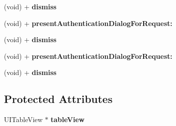 \begin{DoxyCompactItemize}
\item 
\hypertarget{interface_a_s_i_authentication_dialog_a56735bd2a28feda5aa645dbd7bf7b180}{
(void) + {\bfseries dismiss}}
\label{interface_a_s_i_authentication_dialog_a56735bd2a28feda5aa645dbd7bf7b180}

\item 
\hypertarget{interface_a_s_i_authentication_dialog_a07eb1b70ffa5f5279a32a23f3e1de378}{
(void) + {\bfseries present\-Authentication\-Dialog\-For\-Request\-:}}
\label{interface_a_s_i_authentication_dialog_a07eb1b70ffa5f5279a32a23f3e1de378}

\item 
\hypertarget{interface_a_s_i_authentication_dialog_a56735bd2a28feda5aa645dbd7bf7b180}{
(void) + {\bfseries dismiss}}
\label{interface_a_s_i_authentication_dialog_a56735bd2a28feda5aa645dbd7bf7b180}

\item 
\hypertarget{interface_a_s_i_authentication_dialog_a07eb1b70ffa5f5279a32a23f3e1de378}{
(void) + {\bfseries present\-Authentication\-Dialog\-For\-Request\-:}}
\label{interface_a_s_i_authentication_dialog_a07eb1b70ffa5f5279a32a23f3e1de378}

\item 
\hypertarget{interface_a_s_i_authentication_dialog_a56735bd2a28feda5aa645dbd7bf7b180}{
(void) + {\bfseries dismiss}}
\label{interface_a_s_i_authentication_dialog_a56735bd2a28feda5aa645dbd7bf7b180}

\end{DoxyCompactItemize}
\subsection*{\-Protected \-Attributes}
\begin{DoxyCompactItemize}
\item 
\hypertarget{interface_a_s_i_authentication_dialog_a1caf5ba5e197efe8dc44a1115d8f4289}{
\-U\-I\-Table\-View $\ast$ {\bfseries table\-View}}
\label{interface_a_s_i_authentication_dialog_a1caf5ba5e197efe8dc44a1115d8f4289}

\end{DoxyCompactItemize}
